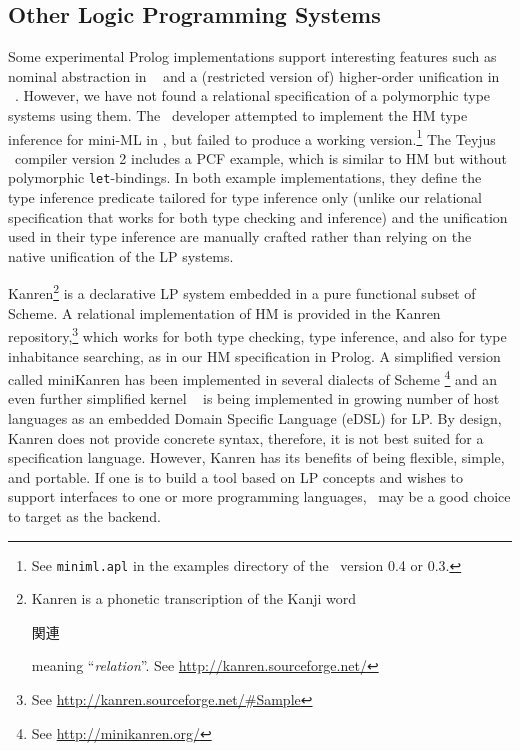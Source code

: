 \subsection{Other Logic Programming Systems}\label{ssec:otherLP}
Some experimental Prolog implementations support interesting features such as
nominal abstraction in \aProlog\ \cite{cheney04iclp} and a (restricted version
of) higher-order unification in \lProlog\ \cite{nadathur99cade}. However, we
have not found a relational specification of a polymorphic type systems using
them. The \aProlog\ developer attempted to implement the HM type inference for
mini-ML in \aProlog, but failed to produce a working version.\footnote{
	See \texttt{miniml.apl} in the examples directory of
	the \aProlog\ version 0.4 or 0.3.}
The Teyjus \lProlog\ compiler version 2 includes a PCF example,
which is similar to HM but without polymorphic \texttt{let}-bindings.
In both example implementations, they define the type inference predicate
tailored for type inference only (unlike our relational specification that
works for both type checking and inference) and the unification used in
their type inference are manually crafted rather than relying on
the native unification of the LP systems.

Kanren\footnote{ Kanren is a phonetic transcription of the Kanji word
	\begin{CJK}{UTF8}{min}{関連}\end{CJK} meaning ``\emph{relation}''.
	See \url{http://kanren.sourceforge.net/} } \cite{ReasonedSchemer}
is a declarative LP system embedded in a pure functional subset of Scheme.
A relational implementation of HM is provided in
the Kanren repository,\footnote{See \url{http://kanren.sourceforge.net/\#Sample}}
which works for both type checking, type inference, and also for
type inhabitance searching, as in our HM specification in Prolog.
A simplified version called miniKanren \cite{minikanrenThesis} has been
implemented in several dialects of Scheme
\footnote{See \url{http://minikanren.org/} }
and an even further simplified kernel \muKanren\ \cite{microKanren}
is being implemented in growing number of host languages as
an embedded Domain Specific Language (eDSL) for LP. By design, Kanren
does not provide concrete syntax, therefore, it is not best suited for
a specification language. However, Kanren has its benefits of being
flexible, simple, and portable. If one is to build a tool based on LP concepts
and wishes to support interfaces to one or more programming languages,
\muKanren\ may be a good choice to target as the backend.


